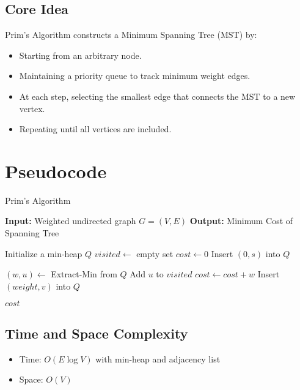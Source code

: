 \documentclass[14pt,a4paper]{extarticle}
\begin{document}
\subsection{Core Idea}
Prim's Algorithm constructs a Minimum Spanning Tree (MST) by:
\begin{itemize}
    \item Starting from an arbitrary node.
    \item Maintaining a priority queue to track minimum weight edges.
    \item At each step, selecting the smallest edge that connects the MST to a new vertex.
    \item Repeating until all vertices are included.
\end{itemize}

\section*{Pseudocode}

\begin{algorithm}[H]
\caption{Prim's Algorithm}
\begin{algorithmic}[1]
\State \textbf{Input:} Weighted undirected graph $G = (V, E)$
\State \textbf{Output:} Minimum Cost of Spanning Tree

    \State Initialize a min-heap $Q$
    \State $visited \gets$ empty set
    \State $cost \gets 0$
    \State Insert $(0, s)$ into $Q$ 

        \State $(w, u) \gets$ Extract-Min from $Q$
            \State Add $u$ to $visited$
            \State $cost \gets cost + w$
                    \State Insert $(weight, v)$ into $Q$
                \EndIf
            \EndFor
        \EndIf
    \EndWhile

    \State \Return $cost$
\EndFunction
\end{algorithmic}
\end{algorithm}

\subsection*{Time and Space Complexity}
\begin{itemize}
    \item Time: $O(E \log V)$ with min-heap and adjacency list
    \item Space: $O(V)$
\end{itemize}
\end{document}
